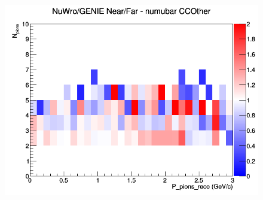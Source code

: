 \documentclass[12pt]{article}
\begin{document}
\begin{figure}[h]
\endminipage
{}
\includegraphics[width=\linewidth]{eff_N_P/FGT/pions/ratios/CCOther_NuWro_GENIE_numubar_NF_N_P.png}
\endminipage
\newline
\end{figure}
\clearpage
\end{document}
